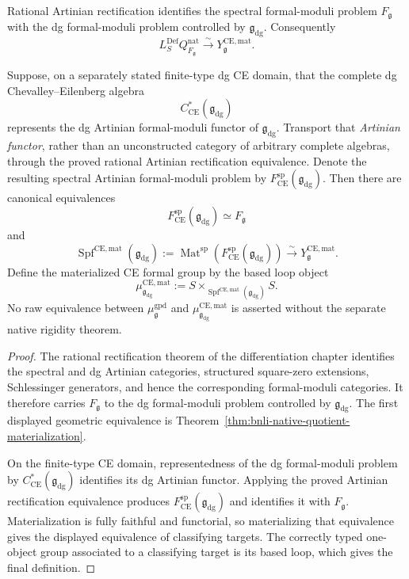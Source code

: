 \begin{theorem}
\label{thm:bnli-rational-comparison}
Rational Artinian rectification identifies the spectral formal-moduli problem
$F_{\mathfrak g}$ with the dg formal-moduli problem controlled by
$\mathfrak g_{\mathrm{dg}}$.  Consequently
\[
\boxed{
    L_S^{\mathrm{Def}}Q^{\mathrm{nat}}_{F_{\mathfrak g}}
    \xrightarrow{\sim}
    Y^{\mathrm{CE,mat}}_{\mathfrak g}.}
\]

Suppose, on a separately stated finite-type dg CE domain, that the complete dg
Chevalley--Eilenberg algebra
\[
    C^*_{\mathrm{CE}}(\mathfrak g_{\mathrm{dg}})
\]
represents the dg Artinian formal-moduli functor of
$\mathfrak g_{\mathrm{dg}}$.  Transport that \emph{Artinian functor}, rather
than an unconstructed category of arbitrary complete algebras, through the
proved rational Artinian rectification equivalence.  Denote the resulting
spectral Artinian formal-moduli problem by
$F^{\mathrm{sp}}_{\mathrm{CE}}(\mathfrak g_{\mathrm{dg}})$.  Then there are
canonical equivalences
\[
\boxed{
    F^{\mathrm{sp}}_{\mathrm{CE}}(\mathfrak g_{\mathrm{dg}})
    \simeq
    F_{\mathfrak g}}
\]
and
\[
\boxed{
    \operatorname{Spf}^{\mathrm{CE,mat}}
    (\mathfrak g_{\mathrm{dg}})
    :=
    \operatorname{Mat}^{\mathrm{sp}}
    \left(F^{\mathrm{sp}}_{\mathrm{CE}}(\mathfrak g_{\mathrm{dg}})\right)
    \xrightarrow{\sim}
    Y^{\mathrm{CE,mat}}_{\mathfrak g}.}
\]
Define the materialized CE formal group by the based loop object
\[
\boxed{
    \mu^{\mathrm{CE,mat}}_{\mathfrak g_{\mathrm{dg}}}
    :=
    S\times_{
      \operatorname{Spf}^{\mathrm{CE,mat}}(\mathfrak g_{\mathrm{dg}})}S.}
\]
No raw equivalence between
$\mu^{\mathrm{gpd}}_{\mathfrak g}$ and
$\mu^{\mathrm{CE,mat}}_{\mathfrak g_{\mathrm{dg}}}$ is asserted without the
separate native rigidity theorem.
\end{theorem}

\begin{proof}
The rational rectification theorem of the differentiation chapter identifies
the spectral and dg Artinian categories, structured square-zero extensions,
Schlessinger generators, and hence the corresponding formal-moduli
categories.  It therefore carries $F_{\mathfrak g}$ to the dg formal-moduli
problem controlled by $\mathfrak g_{\mathrm{dg}}$.  The first displayed
geometric equivalence is
Theorem~\ref{thm:bnli-native-quotient-materialization}.

On the finite-type CE domain, representedness of the dg formal-moduli problem
by $C^*_{\mathrm{CE}}(\mathfrak g_{\mathrm{dg}})$ identifies its dg Artinian
functor.  Applying the proved Artinian rectification equivalence produces
$F^{\mathrm{sp}}_{\mathrm{CE}}(\mathfrak g_{\mathrm{dg}})$ and identifies it
with $F_{\mathfrak g}$.  Materialization is fully faithful and functorial, so
materializing that equivalence gives the displayed equivalence of
classifying targets.  The correctly typed one-object group associated to a
classifying target is its based loop, which gives the final definition.
\end{proof}

